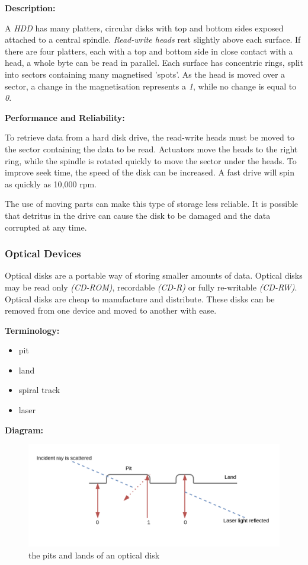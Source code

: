 \documentclass[9pt]{article}
\begin{document}
\textbf{Description:}

A \emph{HDD} has many platters, circular disks with top and bottom sides exposed attached to a central spindle. \emph{Read-write heads} rest slightly above each surface. If there are four platters, each with a top and bottom side in close contact with a head, a whole byte can be read in parallel. Each surface has concentric rings, split into sectors containing many magnetised 'spots'. As the head is moved over a sector, a change in the magnetisation represents a \emph{1}, while no change is equal to \emph{0}.

\textbf{Performance and Reliability:}

To retrieve data from a hard disk drive, the read-write heads must be moved to the sector containing the data to be read. Actuators move the heads to the right ring, while the spindle is rotated quickly to move the sector under the heads. To improve seek time, the speed of the disk can be increased. A fast drive will spin as quickly as 10,000 rpm.

The use of moving parts can make this type of storage less reliable. It is possible that detritus in the drive can cause the disk to be damaged and the data corrupted at any time.

\subsubsection{Optical Devices}
\label{sec:org0371e8c}

Optical disks are a portable way of storing smaller amounts of data. Optical disks may be read only \emph{(CD-ROM)}, recordable \emph{(CD-R)} or fully re-writable \emph{(CD-RW)}. Optical disks are cheap to manufacture and distribute. These disks can be removed from one device and moved to another with ease.

\textbf{Terminology:}

\begin{itemize}
\item pit
\item land
\item spiral track
\item laser
\end{itemize}

\textbf{Diagram:}

\begin{figure}[htbp]
\centering
\includegraphics[width=.9\linewidth]{./images/optical_disk.png}
\caption{the pits and lands of an optical disk}
\end{figure}
\end{document}
